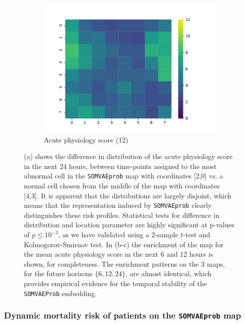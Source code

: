 \begin{figure}[h!]
\begin{subfigure}[t]{0.30\textwidth}
\includegraphics[scale=0.30]{./figures/icu_somvaeprob/detail_heatmaps_full_score_12}
\caption{ Acute physiology score (12)}
\end{subfigure}

\caption{(a) shows the difference in distribution of the acute
         physiology score in the next 24 hours, between time-points assigned to the most 
         abnormal cell in the \texttt{SOMVAEprob} map with coordinates [2,0] vs. 
         a normal cell chosen from the middle of the map with coordinates [4,3]. It is apparent that
         the distributions are largely disjoint, which means that the representation induced by 
         \texttt{SOMVAEprob} clearly distinguishes these risk profiles. Statistical tests for difference
         in distribution and location parameter are highly significant at p-values of $p \leq 10^{-3}$, as we
         have validated using a 2-sample $t$-test and Kolmogorov-Smirnov test. In (b-c) the enrichment 
         of the map for the mean acute physiology score in the next 6 and 12 hours is shown, for completeness.
         The enrichment patterns on the 3 maps, for the future horizons $\{6,12,24\}$, are almost identical, 
         which provides empirical evidence for the temporal stability of the \texttt{SOMVAEProb} embedding.}

\end{figure}


\subsubsection*{Dynamic mortality risk of patients on the \texttt{SOMVAEprob} map}

